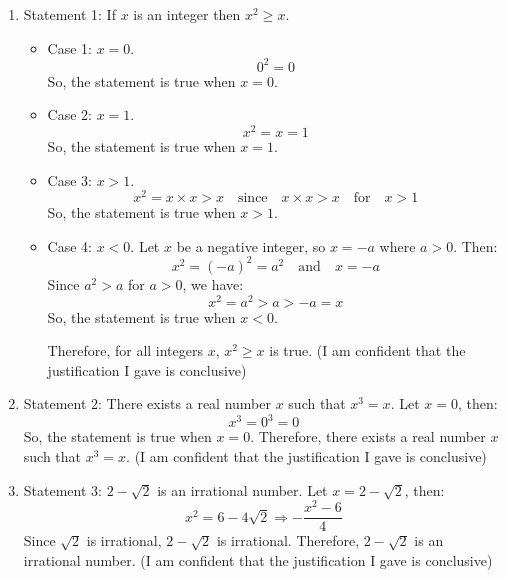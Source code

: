 \documentclass{article}
\begin{document}
\begin{enumerate}
    \item Statement 1: If $x$ is an integer then $x^2 \geq x$.
          \begin{itemize}
              \item Case 1: $x = 0$.
                    \[
                        0^2 = 0
                    \]
                    So, the statement is true when $x = 0$.
              \item Case 2: $x = 1$.
                    \[
                        x^2 = x = 1
                    \]
                    So, the statement is true when $x = 1$.
              \item Case 3: $x > 1$.
                    \[
                        x^2 = x \times x > x \quad \text{since} \quad x \times x > x \quad \text{for} \quad x > 1
                    \]
                    So, the statement is true when $x > 1$.
              \item Case 4: $x < 0$.\newline
                    Let \(x\) be a negative integer, so \(x = -a\) where \(a > 0\). Then:
                    \[
                        x^2 = {(-a)}^2 = a^2 \quad \text{and} \quad x = -a
                    \]
                    Since \(a^2 > a\) for \(a > 0\), we have:
                    \[
                        x^2 = a^2 > a > -a = x
                    \]
                    So, the statement is true when $x < 0$.

                    Therefore, for all integers \(x\), \(x^2 \geq x\) is true.\newline
                    (I am confident that the justification I gave is conclusive)
          \end{itemize}
    \item Statement 2: There exists a real number $x$ such that $x^3 = x$.\newline
          Let \(x = 0\), then:
          \[
              x^3 = 0^3 = 0
          \]
          So, the statement is true when \(x = 0\).\newline
          Therefore, there exists a real number \(x\) such that \(x^3 = x\).\newline
          (I am confident that the justification I gave is conclusive)
    \item Statement 3: $2 - \sqrt{2}$ is an irrational number.\newline
          Let \(x = 2 - \sqrt{2}\), then:
          \[
              x^2 = 6 - 4\sqrt{2} \Rightarrow -\frac{x^2-6}{4}
          \]
          Since \(\sqrt{2}\) is irrational, \(2 - \sqrt{2}\) is irrational.\newline
          Therefore, \(2 - \sqrt{2}\) is an irrational number.\newline
          (I am confident that the justification I gave is conclusive)
\end{enumerate}
\end{document}

